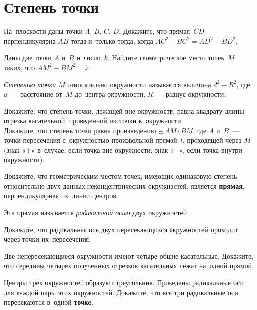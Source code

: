 
\section*{Степень точки}


\begin{problems}

\item
На~плоскости даны точки $A$, $B$, $C$, $D$.
Докажите, что прямая~$CD$ перпендикулярна $AB$ тогда и~только тогда, когда
$AC^2 - BC^2 = AD^2 - BD^2$.

\item
Даны две точки $A$ и~$B$ и~число~$k$.
Найдите геометрическое место точек~$M$ таких, что $AM^2 - BM^2 = k$.

\end{problems}

\emph{Степенью точки} $M$ относительно окружности называется величина
$d^2 - R^2$, где $d$~— расстояние от~$M$ до~центра окружности,
$R$~— радиус окружности.

\begin{problems}

\item
\subproblem
Докажите, что степень точки, лежащей вне окружности, равна квадрату длины
отрезка касательной, проведенной из~точки к~окружности.
\\
\subproblem
Докажите, что степень точки равна произведению $\pm \, AM \cdot BM$, где
$A$ и~$B$~— точки пересечения с~окружностью произвольной прямой~$l$,
проходящей через $M$ (знак «$+$» в~случае, если точка вне окружности;
знак «$-$», если точка внутри окружности).

\item
Докажите, что геометрическим местом точек, имеющих одинаковую степень
относительно двух данных неконцентрических окружностей, является
\textbf{прямая,} перпендикулярная их~линии центров.

\end{problems}

Эта прямая называется \emph{радикальной осью} двух окружностей.

Докажите, что радикальная ось двух пересекающихся окружностей проходит через точки их~пересечения.

\begin{problems}

\item
Две непересекающиеся окружности имеют четыре общие касательные.
Докажите, что середины четырех полученных отрезков касательных лежат на~одной
прямой.

\item
Центры трех окружностей образуют треугольник.
Проведены радикальные оси для каждой пары этих окружностей.
Докажите, что все три радикальные оси пересекаются в~одной \textbf{точке.}

\end{problems}

